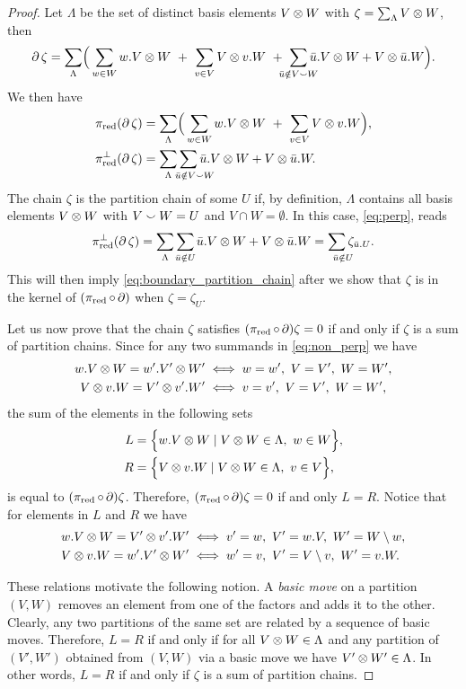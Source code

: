 \begin{proof}
	Let $\Lambda$ be the set of distinct basis elements $V \ot W$ with $\zeta = \sum_\Lambda V \ot W$, then
	\[
	\bd \zeta =
	\sum_{\Lambda} \!\Big(\sum_{w \in W} w.V \ot W \ + \
	\sum_{v \in V} V \ot v.W \ + \
	\sum_{\mathclap{\bar u \notin V \union W}} \bar u.V \ot W + V \ot \bar u.W\Big).
	\]
	We then have
	\begin{align}
		\label{eq:non_perp}
		\pired(\bd \zeta) &=
		\sum_{\Lambda} \!\Big(\sum_{w \in W} w.V \ot W \ + \
		\sum_{v \in V} V \ot v.W\Big), \\
		\label{eq:perp}
		\pi^\perp_{\text{red}}(\bd \zeta) &=
		\sum_{\Lambda} \sum_{\quad\mathclap{\bar u \notin V \union W}} \bar u.V \ot W + V \ot \bar u.W.
	\end{align}
	The chain $\zeta$ is the partition chain of some $U$ if, by definition, $\Lambda$ contains all basis elements $V \ot W$ with $V \union W = U$ and $V \cap W = \emptyset$.
	In this case, \cref{eq:perp}, reads
	\[
	\pi^\perp_{\text{red}}(\bd \zeta) =
	\sum_{\Lambda} \sum_{\mathclap{\bar u \notin U}} \bar u.V \ot W + V \ot \bar u.W =
	\sum_{\quad\mathclap{\bar u \notin U}} \zeta_{\bar u.U}.
	\]
	This will then imply \cref{eq:boundary_partition_chain} after we show that $\zeta$ is in the kernel of $(\pired \circ \bd)$ when $\zeta = \zeta_U$.

	Let us now prove that the chain $\zeta$ satisfies $(\pired \circ \bd)\zeta = 0$ if and only if $\zeta$ is a sum of partition chains.
	Since for any two summands in \cref{eq:non_perp} we have
	\begin{align*}
		w.V \ot W = w'.V' \ot W' &\iff w = w', \ V = V', \ W = W', \\
		V \ot v.W = V' \ot v'.W' &\iff v = v', \ V = V', \ W = W',
	\end{align*}
	the sum of the elements in the following sets
	\begin{align*}
		L &= \set[\Big]{w.V \ot W \mid V \ot W \in \Lambda, \ w \in W}, \\
		R &= \set[\Big]{V \ot v.W \mid V \ot W \in \Lambda, \ v \in V},
	\end{align*}
	is equal to $(\pired \circ \bd) \zeta$.
	Therefore, $(\pired \circ \bd) \zeta = 0$ if and only $L = R$.
	Notice that for elements in $L$ and $R$ we have
	\begin{align*}
		w.V \ot W = V' \ot v'.W' &\iff v' = w, \ V' = w.V, \ W' = W \setminus w, \\
		V \ot v.W = w'.V' \ot W' &\iff w' = v, \ V' = V \setminus v, \ W' = v.W.
	\end{align*}

	These relations motivate the following notion.
	A \textit{basic move} on a partition $(V,W)$ removes an element from one of the factors and adds it to the other.
	Clearly, any two partitions of the same set are related by a sequence of basic moves.
	Therefore, $L = R$ if and only if for all $V \ot W \in \Lambda$ and any partition of $(V',W')$ obtained from $(V,W)$ via a basic move we have $V' \ot W' \in \Lambda$.
	In other words, $L = R$ if and only if $\zeta$ is a sum of partition chains.
\end{proof}

